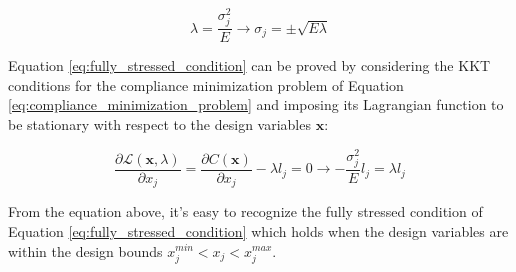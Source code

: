 \begin{equation}
    \lambda = \frac{\sigma_j^2}{E} \rightarrow \sigma_j = \pm \sqrt{E \lambda}
    \label{eq:fully_stressed_condition}
\end{equation}

Equation \ref{eq:fully_stressed_condition} can be proved by considering the KKT conditions for the compliance minimization problem of Equation \ref{eq:compliance_minimization_problem} and imposing its Lagrangian function to be stationary with respect to the design variables $\bm{x}$:

\begin{equation}
    \frac{\partial \mathcal{L}(\bm{x}, \lambda)}{\partial x_j} = \frac{\partial C(\bm{x})}{\partial x_j} - \lambda l_j = 0 \rightarrow -\frac{\sigma_j^2}{E} l_j = \lambda l_j
\end{equation}

From the equation above, it's easy to recognize the fully stressed condition of Equation \ref{eq:fully_stressed_condition} which holds when the design variables are within the design bounds $x_j^{min} < x_j < x_j^{max}$.

